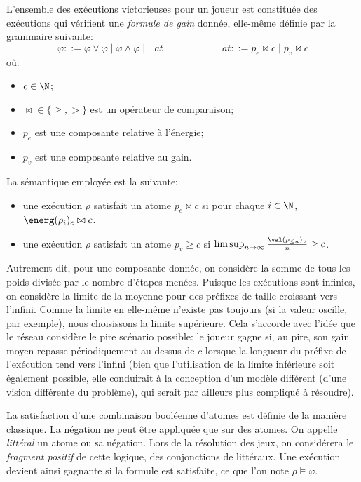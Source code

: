 L'ensemble des exécutions victorieuses pour un joueur est constituée des exécutions qui vérifient une \emph{formule de gain} donnée, elle-même définie par la grammaire suivante:
\[ \varphi ::= \varphi \vee \varphi \mid \varphi \wedge \varphi \mid \neg\mathit{at}
\hspace{6em}
\mathit{at} ::= p_e \bowtie c \mid p_v \bowtie c \]
où:
\begin{itemize}
    \item $c \in \N$;
    \item $\bowtie \in \{\geq,>\}$ est un opérateur de comparaison;
    \item $p_e$ est une composante relative à l'énergie;
    \item $p_v$ est une composante relative au gain.
\end{itemize}

La sémantique employée est la suivante:
\begin{itemize}
    \item une exécution $\rho$ satisfait un atome $p_e \bowtie c$ si pour chaque $i \in \N$, $\energ(\rho_i)_e \bowtie c$.
    \item une exécution $\rho$ satisfait un atome $p_v \geq c$ si $\limsup_{n \rightarrow \infty} \frac{\val(\rho_{\leq n})_v}{n} \geq c$.
\end{itemize}
Autrement dit, pour une composante donnée, on considère la somme de tous les poids divisée par le nombre d'étapes menées.
Puisque les exécutions sont infinies, on considère la limite de la moyenne pour des préfixes de taille croissant vers l'infini.
Comme la limite en elle-même n'existe pas toujours (si la valeur oscille, par exemple), nous choisissons la limite supérieure.
Cela s'accorde avec l'idée que le réseau considère le pire scénario possible: le joueur gagne si, au pire, son gain moyen repasse périodiquement au-dessus de $c$ lorsque la longueur du préfixe de l'exécution tend vers l'infini (bien que l'utilisation de la limite inférieure soit également possible, elle conduirait à la conception d'un modèle différent (d'une vision différente du problème), qui serait par ailleurs plus compliqué à résoudre).

La satisfaction d'une combinaison booléenne d'atomes est définie de la manière classique.
La négation ne peut être appliquée que sur des atomes.
On appelle \emph{littéral} un atome ou sa négation.
Lors de la résolution des jeux, on considérera le \emph{fragment positif} de cette logique, \cad des conjonctions de littéraux.
Une exécution devient ainsi gagnante si la formule est satisfaite, ce que l'on note $\rho\vDash\varphi$.

